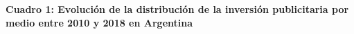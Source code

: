 \textbf{Cuadro 1: Evolución de la distribución de la inversión publicitaria por medio entre 2010 y 2018 en Argentina}

